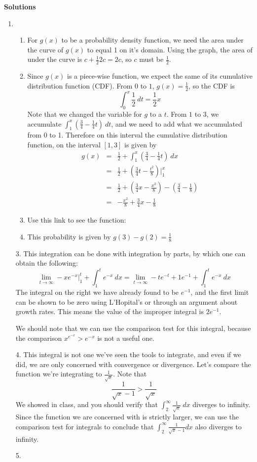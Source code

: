 \documentclass{article}
\begin{document}
    \begin{center}
        \textbf{\Large{Solutions}}
    \end{center}
    \begin{enumerate}
    \item 
    \begin{enumerate}
    \item 
    For $g(x)$ to be a probability density function, we need the area under the curve of $g(x)$ to equal 1 on it's domain.  Using the graph, the area of under the curve is $c+\frac{1}{2}2c = 2c$, so $c$ must be $\frac{1}{2}$.
    \item Since $g(x)$ is a piece-wise function, we expect the same of its cumulative distribution function (CDF).   From $0$ to $1$, $g(x)=\frac{1}{2}$, so the CDF is
    \[\int_0^x \frac{1}{2}\ dt = \frac{1}{2}x\]
    Note that we changed the variable for $g$ to a $t$. From $1$ to $3$, we accumulate $\int_1^x \left(\frac{3}{4}-\frac{1}{4}t\right)\ dt$, and we need to add what we accumulated from 0 to 1. Therefore on this interval the cumulative distribution function, on the interval $[1,3]$ is given by
    \begin{eqnarray*}
    g(x) &=&\frac{1}{2} + \int_1^x \left(\frac{3}{4}-\frac{1}{4}t\right)\ dx \\[1em]
    &=& \frac{1}{2}+\left( \frac{3}{4}t-\frac{t^2}{8}\right)\biggr|_1^x \\[1em]
    &=& \frac{1}{2} +\left(\frac{3}{4}x-\frac{x^2}{8}\right)- \left(\frac{3}{4}-\frac{1}{8} \right) \\[1em]
    &=& -\frac{x^2}{8}+\frac{3}{4}x-\frac{1}{8} 
    \end{eqnarray*}
    \item Use this link to see the function:
    \item This probability is given by $g(3)-g(2)=\frac{1}{8}$
    \end{enumerate}
    \item[3.] This integration can be done with integration by parts, by which one can obtain the following:
    \[\lim_{t\to\infty} -xe^{-x}\biggr|_1^t + \int_1^t e^{-x}\ dx= \lim_{t\to\infty} -te^{-t} +1e^{-1} + \int_1^t e^{-x}\ dx\]
    The integral on the right we have already found to be $e^{-1}$, and the first limit can be shown to be zero using L'Hopital's or through an argument about growth rates. This means the value of the improper integral is $2e^{-1}$.  
    
    We should note that we can use the comparison test for this integral, because the comparison $x^{e^{-x}}>e^{-x}$ is not a useful one.
    \item[4.] This integral is not one we've seen the tools to integrate, and even if we did, we are only concerned with convergence or divergence. Let's compare the function we're integrating to  $\frac{1}{\sqrt{x}}$. Note that 
    \[\frac{1}{\sqrt{x}-1} > \frac{1}{\sqrt{x}}\]
    We showed in class, and you should verify that $\int_2^\infty \frac{1}{\sqrt{x}}\ dx$ diverges to infinity.  Since the function we are concerned with is strictly larger, we can use the comparison test for integrals to conclude that $\int_2^{\infty} \frac{1}{\sqrt{x}-1}dx$ also diverges to infinity.
    \item[5.] 
    \end{enumerate}
\end{document}
